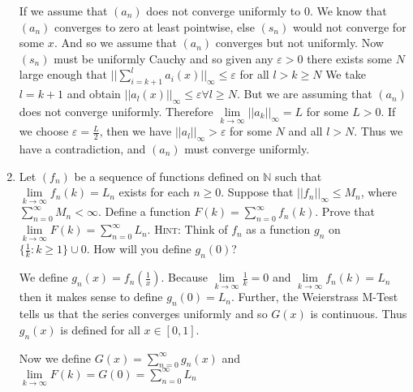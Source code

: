\documentclass[letterpaper]{article}
\begin{document}
\begin{enumerate}
If we assume that $(a_n)$ does not converge uniformly to 0.
We know that $(a_n)$ converges to zero at least pointwise, else $(s_n)$ would not converge for some $x$. And so we assume that $(a_n)$ converges but not uniformly. Now $(s_n)$ must be uniformly Cauchy and so given any $\varepsilon>0$ there exists some $N$ large enough that $||\sum\limits_{i=k+1}^l{a_i(x)}||_\infty\le \varepsilon$ for all $l>k\ge N$ We take $l=k+1$ and obtain $||a_l(x)||_\infty\le \varepsilon\forall l\ge N$. But we are assuming that $(a_n)$ does not converge uniformly. Therefore $\lim\limits_{k\to\infty}||a_k||_\infty=L$ for some $L>0$. If we choose $\varepsilon=\frac{L}{2}$, then we have $||a_l||_\infty > \varepsilon$ for some $N$ and all $l>N$. Thus we have a contradiction, and $(a_n)$ must converge uniformly.
\setcounter{enumi}{9}
\item
Let $(f_n)$ be a sequence of functions defined on $\mathbb{N}$ such that $\lim\limits_{k\to\infty}f_n(k)=L_n$ exists for each $n\ge 0$. Suppose that $||f_n||_\infty\le M_n$, where $\sum\limits_{n=0}^\infty{M_n}<\infty$. Define a function $F(k)=\sum\limits_{n=0}^\infty{f_n(k)}$. Prove that $\lim\limits_{k\to\infty}F(k)=\sum\limits_{n=0}^\infty{L_n}$.
{\scshape Hint:} Think of $f_n$ as a function $g_n$ on $\{\frac{1}{k}:k\ge 1\}\cup{0}$. How will you define $g_n(0)$?

We define $g_n(x)=f_n(\frac{1}{x})$. Because $\lim\limits_{k\to\infty}\frac{1}{k}=0$ and $\lim\limits_{k\to\infty}f_n(k)=L_n$ then it makes sense to define $g_n(0)=L_n$. Further, the Weierstrass M-Test tells us that the series converges uniformly and so $G(x)$ is continuous. Thus $g_n(x)$ is defined for all $x\in[0,1]$.

Now we define $G(x)=\sum\limits_{n=0}^\infty{g_n(x)}$ and $\lim\limits_{k\to\infty}F(k)=G(0)=\sum\limits_{n=0}^\infty{L_n}$
\end{enumerate}
\end{document}
